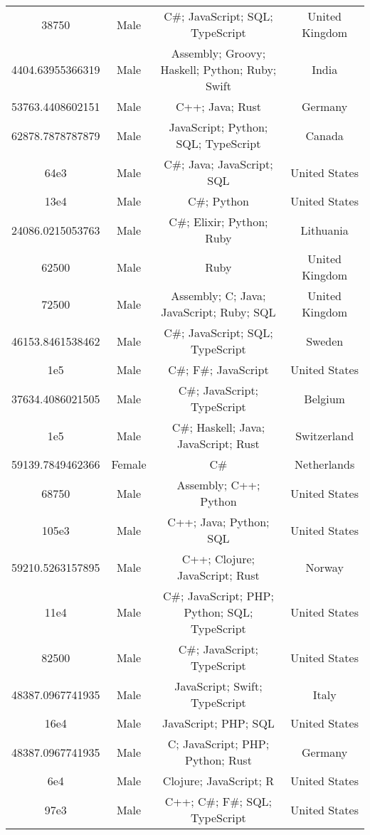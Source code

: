 \begin{center}
\begin{tabular}{ |c|c|c|c| }
38750  &  Male  &  C\#; JavaScript; SQL; TypeScript  &  United Kingdom  \\ 
4404.63955366319  &  Male  &  Assembly; Groovy; Haskell; Python; Ruby; Swift  &  India  \\ 
53763.4408602151  &  Male  &  C++; Java; Rust  &  Germany  \\ 
62878.7878787879  &  Male  &  JavaScript; Python; SQL; TypeScript  &  Canada  \\ 
64e3  &  Male  &  C\#; Java; JavaScript; SQL  &  United States  \\ 
13e4  &  Male  &  C\#; Python  &  United States  \\ 
24086.0215053763  &  Male  &  C\#; Elixir; Python; Ruby  &  Lithuania  \\ 
62500  &  Male  &  Ruby  &  United Kingdom  \\ 
72500  &  Male  &  Assembly; C; Java; JavaScript; Ruby; SQL  &  United Kingdom  \\ 
46153.8461538462  &  Male  &  C\#; JavaScript; SQL; TypeScript  &  Sweden  \\ 
1e5  &  Male  &  C\#; F\#; JavaScript  &  United States  \\ 
37634.4086021505  &  Male  &  C\#; JavaScript; TypeScript  &  Belgium  \\ 
1e5  &  Male  &  C\#; Haskell; Java; JavaScript; Rust  &  Switzerland  \\ 
59139.7849462366  &  Female  &  C\#  &  Netherlands  \\ 
68750  &  Male  &  Assembly; C++; Python  &  United States  \\ 
105e3  &  Male  &  C++; Java; Python; SQL  &  United States  \\ 
59210.5263157895  &  Male  &  C++; Clojure; JavaScript; Rust  &  Norway  \\ 
11e4  &  Male  &  C\#; JavaScript; PHP; Python; SQL; TypeScript  &  United States  \\ 
82500  &  Male  &  C\#; JavaScript; TypeScript  &  United States  \\ 
48387.0967741935  &  Male  &  JavaScript; Swift; TypeScript  &  Italy  \\ 
16e4  &  Male  &  JavaScript; PHP; SQL  &  United States  \\ 
48387.0967741935  &  Male  &  C; JavaScript; PHP; Python; Rust  &  Germany  \\ 
6e4  &  Male  &  Clojure; JavaScript; R  &  United States  \\ 
97e3  &  Male  &  C++; C\#; F\#; SQL; TypeScript  &  United States  \\ 

\end{tabular}
\end{center}
